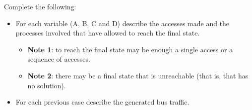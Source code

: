 \medskip

Complete the following:

\begin{itemize}

  \item For each variable (A, B, C and D) describe the
accesses made and the processes involved that have allowed to reach
the final state.
 

    \begin{itemize}

      \item \textbf{Note 1}: to reach the final state may be enough
a single access or a sequence of accesses.

      \item \textbf{Note 2}: there may be a final state
that is unreachable (that is, that has no solution).

    \end{itemize}

  \item For each previous case describe the generated bus traffic.

\end{itemize}

\begin{acsolution}\end{acsolution}

